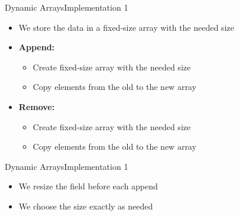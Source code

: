\begin{frame}{Dynamic Arrays}{Implementation 1}
  \begin{itemize}
    \item
      We store the data in a fixed-size array with the needed size
    \item
      \textbf{Append:}
      \begin{itemize}
        \item
          Create fixed-size array with the needed size
        \item
          Copy elements from the old to the new array
      \end{itemize}
    \item
      \textbf{Remove:}
      \begin{itemize}
        \item
          Create fixed-size array with the needed size
        \item
          Copy elements from the old to the new array
      \end{itemize}
  \end{itemize}
\end{frame}


\begin{frame}{Dynamic Arrays}{Implementation 1}
  \begin{itemize}
    \item
      We resize the field before each append
    \item
      We choose the size exactly as needed
  \end{itemize}
\end{frame}





